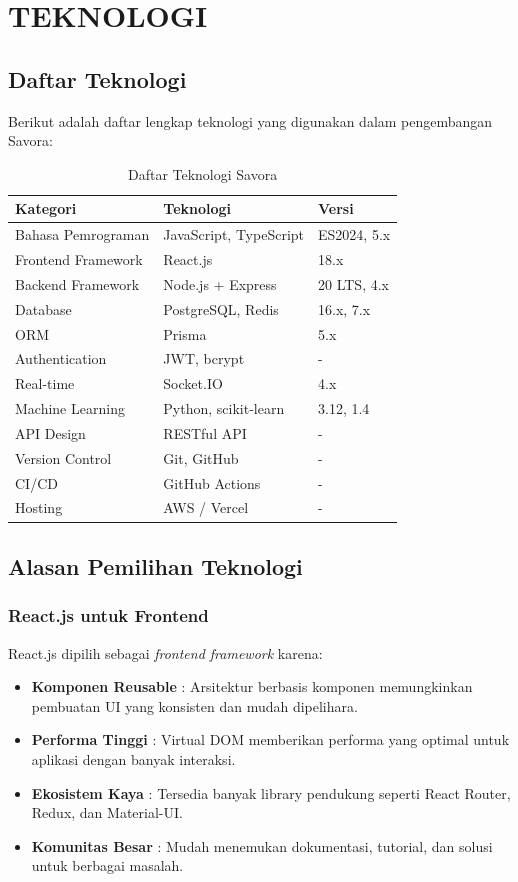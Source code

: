 \section{TEKNOLOGI}

\subsection{Daftar Teknologi}

Berikut adalah daftar lengkap teknologi yang digunakan dalam pengembangan Savora:

\begin{table}[H]
\centering
\caption{Daftar Teknologi Savora}
\label{tab:daftar_teknologi}
\small
\begin{tabularx}{\textwidth}{|l|X|X|}
\hline
\textbf{Kategori} & \textbf{Teknologi} & \textbf{Versi} \\
\hline
Bahasa Pemrograman & JavaScript, TypeScript & ES2024, 5.x \\
\hline
Frontend Framework & React.js & 18.x \\
\hline
Backend Framework & Node.js + Express & 20 LTS, 4.x \\
\hline
Database & PostgreSQL, Redis & 16.x, 7.x \\
\hline
ORM & Prisma & 5.x \\
\hline
Authentication & JWT, bcrypt & - \\
\hline
Real-time & Socket.IO & 4.x \\
\hline
Machine Learning & Python, scikit-learn & 3.12, 1.4 \\
\hline
API Design & RESTful API & - \\
\hline
Version Control & Git, GitHub & - \\
\hline
CI/CD & GitHub Actions & - \\
\hline
Hosting & AWS / Vercel & - \\
\hline
\end{tabularx}
\end{table}

\subsection{Alasan Pemilihan Teknologi}

\subsubsection{React.js untuk Frontend}
React.js dipilih sebagai \textit{frontend framework} karena:
\begin{itemize}[leftmargin=*]
    \item \textbf{Komponen Reusable} : Arsitektur berbasis komponen memungkinkan pembuatan UI yang konsisten dan mudah dipelihara.
    \item \textbf{Performa Tinggi} : Virtual DOM memberikan performa yang optimal untuk aplikasi dengan banyak interaksi.
    \item \textbf{Ekosistem Kaya} : Tersedia banyak library pendukung seperti React Router, Redux, dan Material-UI.
    \item \textbf{Komunitas Besar} : Mudah menemukan dokumentasi, tutorial, dan solusi untuk berbagai masalah.
\end{itemize}

